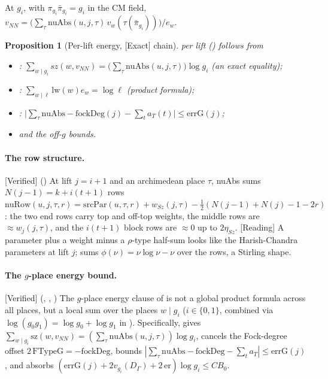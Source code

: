 \documentclass[11pt]{article}
\newcommand{\Exact}{\textcolor{exactc}{\textsf{\small[Exact]}}}
\newcommand{\Verified}{\textcolor{verc}{\textsf{\small[Verified]}}}
\newcommand{\Reading}{\textcolor{readc}{\textsf{\small[Reading]}}}
\theoremstyle{plain}
\newtheorem{proposition}[theorem]{Proposition}
\theoremstyle{definition}
\begin{document}
At $g_i$, with $\pi_{g_i}\bar\pi_{g_i}=g_i$ in the CM field,
$v_{NN}=\bigl(\sum_\tau \mathrm{nuAbs}(u,j,\tau)\,v_w(\tau(\bar\pi_{g_i}))\bigr)/e_w$.

\begin{proposition}[Per-lift energy, \Exact{} chain]
 per lift () follows from
\begin{itemize}
\item {}: $\sum_{w\mid g_i} sz(w,v_{NN}) = \bigl(\sum_\tau\mathrm{nuAbs}(u,j,\tau)\bigr)\log g_i$ (an exact equality);
\item {}: $\sum_{w\mid \ell}\mathrm{lw}(w)e_w = \log \ell$ (product formula);
\item {}: $\bigl|\sum_\tau\mathrm{nuAbs} - \mathrm{fockDeg}(j) - \sum_t a_T(t)\bigr|\le \mathrm{errG}(j)$;
\item {} and the off-$g$ bounds.
\end{itemize}
\end{proposition}

\paragraph{The row structure.} \Verified{} () At lift $j=i+1$ and an
archimedean place $\tau$, nuAbs sums $N(j-1)=k+i(t+1)$ rows
$\mathrm{nuRow}(u,j,\tau,r)=\mathrm{srcPar}(u,\tau,r)+w_{Sz}(j,\tau)-\tfrac12(N(j-1)+N(j)-1-2r)$:
the two end rows carry top and off-top weights, the middle rows are $\approx w_j(j,\tau)$, and the
$i(t+1)$ block rows are $\approx 0$ up to $2\eta_{Sz}$.
\Reading{} A parameter plus a weight minus a $\rho$-type half-sum looks like the Harish-Chandra
parameters at lift $j$;  sums $\phi(\nu)=\nu\log\nu-\nu$ over the rows, a Stirling
shape.

\paragraph{The $g$-place energy bound.} \Verified{} (,
, ) The $g$-place energy
clause of  is not a global product formula across all places, but a local sum
over the places $w\mid g_i$ ($i\in\{0,1\}$, combined via $\log(g_0g_1)=\log g_0+\log g_1$ in
). Specifically,  gives
$\sum_{w\mid g_i}\mathrm{sz}(w,v_{NN})=(\sum_\tau\mathrm{nuAbs}(u,j,\tau))\log g_i$,
 cancels the Fock-degree offset $2\,\mathrm{FTypeG}=-\mathrm{fockDeg}$,
 bounds $|\sum_\tau\mathrm{nuAbs}-\mathrm{fockDeg}-\sum_t a_T|\le\mathrm{errG}(j)$,
and  absorbs $(\mathrm{errG}(j)+2v_{g_i}(D_\Gamma)+2\,\mathrm{er})\log g_i\le C B_0$.
\end{document}
